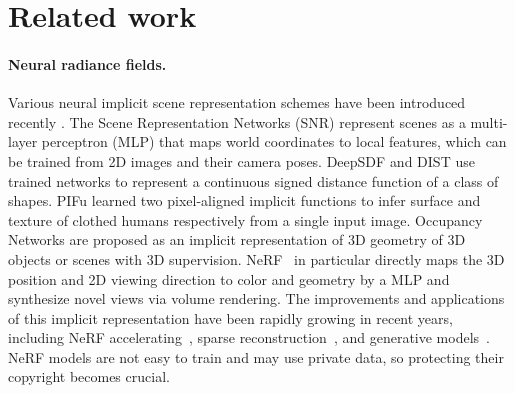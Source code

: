 \documentclass[10pt,twocolumn,letterpaper]{article}
\begin{document}
\section{Related work}

\paragraph{Neural radiance fields.} Various neural implicit scene representation schemes have been introduced recently \cite{niemeyer2020differentiable, yariv2020multiview, zhu2022neural}. The Scene Representation Networks (SNR) \cite{sitzmann2019scene} represent scenes as a multi-layer perceptron (MLP) that maps world coordinates to local features, which can be trained from 2D images and their camera poses. DeepSDF \cite{park2019deepsdf} and DIST \cite{liu2020dist} use trained networks to represent a continuous signed distance function of a class of shapes. PIFu \cite{saito2019pifu} learned two pixel-aligned implicit functions to infer surface and texture of clothed humans respectively from a single input image. Occupancy Networks \cite{mescheder2019occupancy, peng2020convolutional} are proposed as an implicit representation of 3D geometry of 3D objects or scenes with 3D supervision. 
NeRF~\cite{nerf2020, zhu2023occlusion} in particular directly maps the 3D position and 2D viewing direction to color and geometry by a MLP and synthesize novel views via volume rendering. The improvements and applications of this implicit representation have been rapidly growing in recent years, including NeRF accelerating~\cite{fridovich2022plenoxels, neff2021donerf}, sparse reconstruction~\cite{yu2021pixelnerf, chen2021mvsnerf}, and generative models~\cite{schwarz2020graf, chan2021pi}. NeRF models are not easy to train and may use private data, so protecting their copyright becomes crucial.


\end{document}

